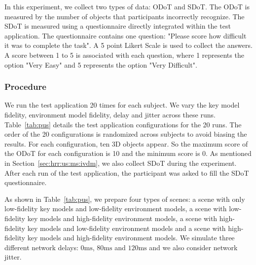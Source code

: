 In this experiment, we collect two types of data: ODoT and SDoT.
The ODoT is measured by the number of objects that participants incorrectly recognize.
The SDoT is measured using a questionnaire directly integrated within the test application. The questionnaire contains one question: "Please score how difficult it was to complete the task". A 5 point Likert Scale is used to collect the answers. A score between 1 to 5 is associated with each question, where 1 represents the option "Very Easy" and 5 represents the option "Very Difficult".

\subsubsection{Procedure}

We run the test application 20 times for each subject. We vary the key model fidelity, environment model fidelity, delay and jitter across these runs. Table~\ref{tab:pus} details the test application configurations for the 20 runs. The order of the 20 configurations is randomized across subjects to avoid biasing the results.
For each configuration, ten 3D objects appear. So the maximum score of the ODoT for each configuration is 10 and the minimum score is 0.
As mentioned in Section~\ref{sec:hrr:us:ms:ivdm}, we also collect SDoT during the experiment. After each run of the test application, the participant was asked to fill the SDoT questionnaire.

As shown in Table~\ref{tab:pus}, we prepare four types of scenes: a scene with only low-fidelity key models and low-fidelity environment models, a scene with low-fidelity key models and high-fidelity environment models, a scene with high-fidelity key models and low-fidelity environment models and a scene with high-fidelity key models and high-fidelity environment models. We simulate three different network delays: $0\mathrm{ms}$, $80\mathrm{ms}$ and $120\mathrm{ms}$ and we also consider network jitter.

